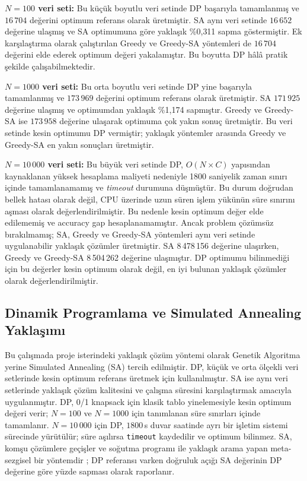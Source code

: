 \documentclass[conference,a4paper]{IEEEtran}
\begin{document}
\noindent\textbf{$N{=}100$ veri seti:}
Bu küçük boyutlu veri setinde DP başarıyla tamamlanmış ve $16\,704$ değerini optimum referans olarak üretmiştir. SA aynı veri setinde $16\,652$ değerine ulaşmış ve SA optimumuna göre yaklaşık \%0{,}311 sapma göstermiştir. Ek karşılaştırma olarak çalıştırılan Greedy ve Greedy-SA yöntemleri de $16\,704$ değerini elde ederek optimum değeri yakalamıştır. Bu boyutta DP hâlâ pratik şekilde çalışabilmektedir.

\noindent\textbf{$N{=}1000$ veri seti:}
Bu orta boyutlu veri setinde DP yine başarıyla tamamlanmış ve $173\,969$ değerini optimum referans olarak üretmiştir. SA $171\,925$ değerine ulaşmış ve optimumdan yaklaşık \%1{,}174 sapmıştır. Greedy ve Greedy-SA ise $173\,958$ değerine ulaşarak optimuma çok yakın sonuç üretmiştir. Bu veri setinde kesin optimumu DP vermiştir; yaklaşık yöntemler arasında Greedy ve Greedy-SA en yakın sonuçları üretmiştir.

\noindent\textbf{$N=10\,000$ veri seti:}
Bu büyük veri setinde DP, $O(N \times C)$ yapısından kaynaklanan yüksek hesaplama maliyeti nedeniyle 1800 saniyelik zaman sınırı içinde tamamlanamamış ve \textit{timeout} durumuna düşmüştür. Bu durum doğrudan bellek hatası olarak değil, CPU üzerinde uzun süren işlem yükünün süre sınırını aşması olarak değerlendirilmiştir. Bu nedenle kesin optimum değer elde edilememiş ve accuracy gap hesaplanamamıştır. Ancak problem çözümsüz bırakılmamış; SA, Greedy ve Greedy-SA yöntemleri aynı veri setinde uygulanabilir yaklaşık çözümler üretmiştir. SA 8\,478\,156 değerine ulaşırken, Greedy ve Greedy-SA 8\,504\,262 değerine ulaşmıştır. DP optimumu bilinmediği için bu değerler kesin optimum olarak değil, en iyi bulunan yaklaşık çözümler olarak değerlendirilmiştir.

\subsection{Dinamik Programlama ve Simulated Annealing Yaklaşımı}
Bu çalışmada proje isterindeki yaklaşık çözüm yöntemi olarak Genetik Algoritma yerine Simulated Annealing (SA) tercih edilmiştir. DP, küçük ve orta ölçekli veri setlerinde kesin optimum referans üretmek için kullanılmıştır. SA ise aynı veri setlerinde yaklaşık çözüm kalitesini ve çalışma süresini karşılaştırmak amacıyla uygulanmıştır. DP, 0/1 knapsack için klasik tablo yinelemesiyle kesin optimum değeri verir; $N{=}100$ ve $N{=}1000$ için tanımlanan süre sınırları içinde tamamlanır. $N{=}10\,000$ için DP, $1800$\,s duvar saatinde ayrı bir işletim sistemi sürecinde yürütülür; süre aşılırsa \texttt{timeout} kaydedilir ve optimum bilinmez. SA, komşu çözümlere geçişler ve soğutma programı ile yaklaşık arama yapan meta-sezgisel bir yöntemdir \cite{kirkpatrick1983optimization}; DP referansı varken doğruluk açığı SA değerinin DP değerine göre yüzde sapması olarak raporlanır.
\end{document}
